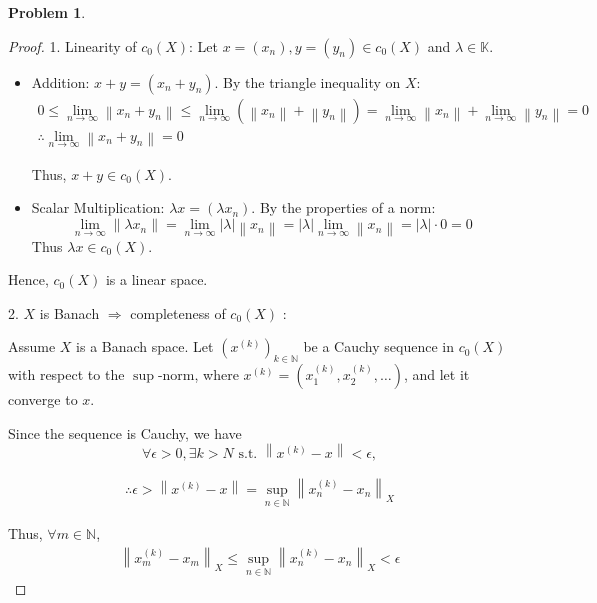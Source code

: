 \documentclass{article}
\newcommand{\norm}[1]{\left\|#1\right\|}
\newcommand{\abs}[1]{\left|#1\right|}
\newcommand{\N}{\mathbb{N}}
\newtheorem{problem}{Problem}
\begin{document}

\begin{problem}

\end{problem}

\begin{proof}
1. Linearity of $c_0(X)$:
Let $x = (x_n), y = (y_n) \in c_0(X)$ and $\lambda \in \mathbb{K}$.
\begin{itemize}
    \item Addition: $x+y = (x_n + y_n)$. By the triangle inequality on $X$:
    \begin{gather}
        0 
        \leq \lim_{n\to\infty}\norm{x_n + y_n} 
        \leq \lim_{n\to\infty}(\norm{x_n} + \norm{y_n})
        = \lim_{n\to\infty}\norm{x_n} + \lim_{n\to\infty}\norm{y_n} = 0
        \\
        \therefore \lim_{n\to\infty} \norm{x_n + y_n} = 0
    \end{gather}
    
    Thus, $x+y \in c_0(X)$.

    \item Scalar Multiplication: $\lambda x = (\lambda x_n)$. By the properties of a norm:
    $$
    \lim_{n\to\infty} \norm{\lambda x_n} = \lim_{n\to\infty} \abs{\lambda} \norm{x_n} = \abs{\lambda} \lim_{n\to\infty} \norm{x_n} = \abs{\lambda} \cdot 0 = 0
    $$
    Thus $\lambda x \in c_0(X)$.
\end{itemize}
Hence, $c_0(X)$ is a linear space.

2. $X$ is Banach $\Longrightarrow$ completeness of $c_0(X)$ :

Assume $X$ is a Banach space. Let $(x^{(k)})_{k\in\N}$ be a Cauchy sequence in $c_0(X)$ with respect to the $\sup$-norm, where $x^{(k)} = (x_1^{(k)}, x_2^{(k)}, \ldots)$, and let it converge to $x$.

Since the sequence is Cauchy, we have
$$
\forall \epsilon > 0, \exists k > N \text{ s.t. } 
\norm{x^{(k)} - x} < \epsilon, 
$$

\begin{gather}
\therefore \epsilon > \norm{x^{(k)} - x}
= \sup_{n\in\N} \norm{x_n^{(k)} - x_n}_{X}
\end{gather}

Thus, $\forall m \in \N$,
\begin{gather}
\norm{x_m^{(k)} - x_m}_X
\leq \sup_{n\in\N} \norm{x_n^{(k)} - x_n}_{X}
< \epsilon
\end{gather}


\end{proof}
\end{document}
